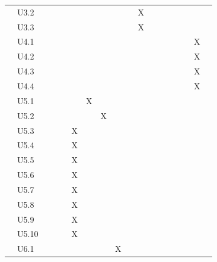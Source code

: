 \documentclass[hidelinks, 12pt, a4paper]{article}
\begin{document}
\begin{table}[H]
\begin{tabular}{|l|l|l|c|c|c|c|c|c|c|c|c|c|c|c|c|c|c|}
             & U3.2  &    &    &    &    &    &    &    &    & X  &     &     &     &     &     &     \\ \cline{2-17}
             & U3.3  &    &    &    &    &    &    &    &    & X  &     &     &     &     &     &     \\ \cline{2-17}
             & U4.1  &    &    &    &    &    &    &    &    &    &     &     &     &     &     & X   \\ \cline{2-17}
             & U4.2  &    &    &    &    &    &    &    &    &    &     &     &     &     &     & X   \\ \cline{2-17}
             & U4.3  &    &    &    &    &    &    &    &    &    &     &     &     &     &     & X   \\ \cline{2-17}
             & U4.4  &    &    &    &    &    &    &    &    &    &     &     &     &     &     & X   \\ \cline{2-17}
             & U5.1  &    &    &    &    & X  &    &    &    &    &     &     &     &     &     &     \\ \cline{2-17}
             & U5.2  &    &    &    &    &    & X  &    &    &    &     &     &     &     &     &     \\ \cline{2-17}
             & U5.3  &    &    &    & X  &    &    &    &    &    &     &     &     &     &     &     \\ \cline{2-17}
             & U5.4  &    &    &    & X  &    &    &    &    &    &     &     &     &     &     &     \\ \cline{2-17}
             & U5.5  &    &    &    & X  &    &    &    &    &    &     &     &     &     &     &     \\ \cline{2-17}
             & U5.6  &    &    &    & X  &    &    &    &    &    &     &     &     &     &     &     \\ \cline{2-17}
             & U5.7  &    &    &    & X  &    &    &    &    &    &     &     &     &     &     &     \\ \cline{2-17}
             & U5.8  &    &    &    & X  &    &    &    &    &    &     &     &     &     &     &     \\ \cline{2-17}
             & U5.9  &    &    &    & X  &    &    &    &    &    &     &     &     &     &     &     \\ \cline{2-17}
             & U5.10 &    &    &    & X  &    &    &    &    &    &     &     &     &     &     &     \\ \cline{2-17}
             & U6.1  &    &    &    &    &    &    & X  &    &    &     &     &     &     &     &     \\ \cline{2-17}

\end{tabular}
\end{table}
\end{document}
